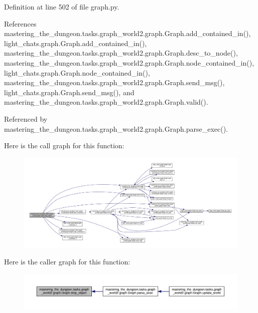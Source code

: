 Definition at line 502 of file graph.\+py.



References mastering\+\_\+the\+\_\+dungeon.\+tasks.\+graph\+\_\+world2.\+graph.\+Graph.\+add\+\_\+contained\+\_\+in(), light\+\_\+chats.\+graph.\+Graph.\+add\+\_\+contained\+\_\+in(), mastering\+\_\+the\+\_\+dungeon.\+tasks.\+graph\+\_\+world2.\+graph.\+Graph.\+desc\+\_\+to\+\_\+node(), mastering\+\_\+the\+\_\+dungeon.\+tasks.\+graph\+\_\+world2.\+graph.\+Graph.\+node\+\_\+contained\+\_\+in(), light\+\_\+chats.\+graph.\+Graph.\+node\+\_\+contained\+\_\+in(), mastering\+\_\+the\+\_\+dungeon.\+tasks.\+graph\+\_\+world2.\+graph.\+Graph.\+send\+\_\+msg(), light\+\_\+chats.\+graph.\+Graph.\+send\+\_\+msg(), and mastering\+\_\+the\+\_\+dungeon.\+tasks.\+graph\+\_\+world2.\+graph.\+Graph.\+valid().



Referenced by mastering\+\_\+the\+\_\+dungeon.\+tasks.\+graph\+\_\+world2.\+graph.\+Graph.\+parse\+\_\+exec().

Here is the call graph for this function\+:
\nopagebreak
\begin{figure}[H]
\begin{center}
\leavevmode
\includegraphics[width=350pt]{classmastering__the__dungeon_1_1tasks_1_1graph__world2_1_1graph_1_1Graph_a9ba4511655170a43b78a2600d8749a78_cgraph}
\end{center}
\end{figure}
Here is the caller graph for this function\+:
\nopagebreak
\begin{figure}[H]
\begin{center}
\leavevmode
\includegraphics[width=350pt]{classmastering__the__dungeon_1_1tasks_1_1graph__world2_1_1graph_1_1Graph_a9ba4511655170a43b78a2600d8749a78_icgraph}
\end{center}
\end{figure}
\mbox{\label{classmastering__the__dungeon_1_1tasks_1_1graph__world2_1_1graph_1_1Graph_a305d2db72903f116e864dbe6c0005cdf}} 
